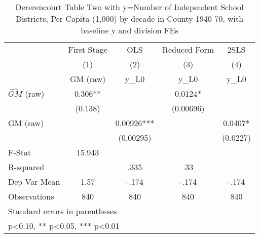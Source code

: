 \begin{table}[htbp]\centering
\def\sym#1{\ifmmode^{#1}\else\(^{#1}\)\fi}
\caption{Dererencourt Table Two with y=Number of Independent School Districts, Per Capita (1,000) by decade in County 1940-70, with baseline y and division FEs}
\begin{tabular}{l*{4}{c}}
\toprule
                    & First Stage   &         OLS   &Reduced Form   &        2SLS   \\
                    &\multicolumn{1}{c}{(1)}&\multicolumn{1}{c}{(2)}&\multicolumn{1}{c}{(3)}&\multicolumn{1}{c}{(4)}\\
                    &\multicolumn{1}{c}{GM  (raw)}&\multicolumn{1}{c}{y\_L0}&\multicolumn{1}{c}{y\_L0}&\multicolumn{1}{c}{y\_L0}\\
\midrule
$\hat{GM}$ (raw)    &       0.306** &               &      0.0124*  &               \\
                    &     (0.138)   &               &   (0.00696)   &               \\
\addlinespace
GM  (raw)           &               &     0.00926***&               &      0.0407*  \\
                    &               &   (0.00295)   &               &    (0.0227)   \\
\midrule
F-Stat              &      15.943   &               &               &               \\
R-squared           &               &        .335   &         .33   &               \\
Dep Var Mean        &        1.57   &       -.174   &       -.174   &       -.174   \\
Observations        &         840   &         840   &         840   &         840   \\
\bottomrule
\multicolumn{5}{l}{\footnotesize Standard errors in parentheses}\\
\multicolumn{5}{l}{\footnotesize * p<0.10, ** p<0.05, *** p<0.01}\\
\end{tabular}
\end{table}
